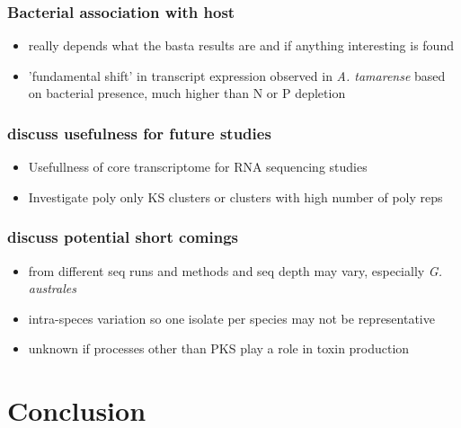 \documentclass[12pt]{article}
\begin{document}
\subsubsection*{Bacterial association with host}
\begin{itemize}
\item really depends what the basta results are and if anything interesting is found
\item 'fundamental shift' in transcript expression observed in \textit{A. tamarense} based on bacterial presence, much higher than N or P depletion \cite{moustafa2010transcriptome}
\end{itemize}

\subsubsection*{discuss usefulness for future studies}
\begin{itemize}
\item Usefullness of core transcriptome for RNA sequencing studies
\item Investigate poly only KS clusters or clusters with high number of poly reps
\end{itemize}

\subsubsection*{discuss potential short comings} 
\begin{itemize}
\item from different seq runs and methods and seq depth may vary, especially \textit{G. australes}
\item intra-speces variation so one isolate per species may not be representative
\item unknown if processes other than PKS play a role in toxin production
\end{itemize}

\section*{Conclusion}
\end{document}
